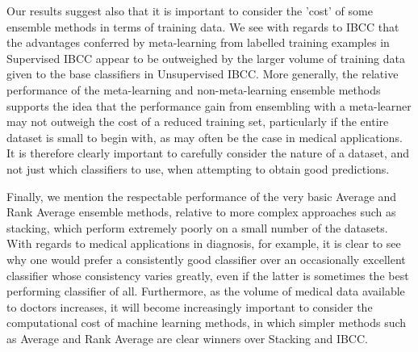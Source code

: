 \documentclass{bmcart}
\begin{document}
\vspace{0.2cm}
\noindent
Our results suggest also that it is important to consider the 'cost' of some ensemble methods in terms of training data. We see with regards to IBCC that the advantages conferred by meta-learning from labelled training examples in Supervised IBCC appear to be outweighed by the larger volume of training data given to the base classifiers in Unsupervised IBCC. More generally, the relative performance of the meta-learning and non-meta-learning ensemble methods supports the idea that the performance gain from ensembling with a meta-learner may not outweigh the cost of a reduced training set, particularly if the entire dataset is small to begin with, as may often be the case in medical applications. It is therefore clearly important to carefully consider the nature of a dataset, and not just which classifiers to use, when attempting to obtain good predictions.

\vspace{0.2cm}
\noindent
Finally, we mention the respectable performance of the very basic Average and Rank Average ensemble methods, relative to more complex approaches such as stacking, which perform extremely poorly on a small number of the datasets. With regards to medical applications in diagnosis, for example, it is clear to see why one would prefer a consistently good classifier over an occasionally excellent classifier whose consistency varies greatly, even if the latter is sometimes the best performing classifier of all. Furthermore, as the volume of medical data available to doctors increases, it will become increasingly important to consider the computational cost of machine learning methods, in which simpler methods such as Average and Rank Average are clear winners over Stacking and IBCC.








\end{document}
